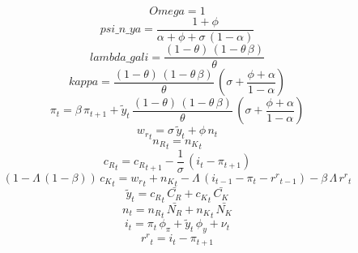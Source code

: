 \begin{dmath*}
Omega = 1
\end{dmath*}
\begin{dmath*}
psi\_n\_ya = \frac{1+{{\phi}}}{{{\alpha}}+{{\phi}}+{{\sigma}}\, \left(1-{{\alpha}}\right)}
\end{dmath*}
\begin{dmath*}
lambda\_gali = \frac{\left(1-{{\theta}}\right)\, \left(1-{{\theta}}\, {{\beta}}\right)}{{{\theta}}}
\end{dmath*}
\begin{dmath*}
kappa = \frac{\left(1-{{\theta}}\right)\, \left(1-{{\theta}}\, {{\beta}}\right)}{{{\theta}}}\, \left({{\sigma}}+\frac{{{\phi}}+{{\alpha}}}{1-{{\alpha}}}\right)
\end{dmath*}
\begin{dmath}
{{\pi}}_{t}={{\beta}}\, {{\pi}}_{t+1}+{{\tilde y}}_{t}\, \frac{\left(1-{{\theta}}\right)\, \left(1-{{\theta}}\, {{\beta}}\right)}{{{\theta}}}\, \left({{\sigma}}+\frac{{{\phi}}+{{\alpha}}}{1-{{\alpha}}}\right)
\end{dmath}
\begin{dmath}
{{w_r}}_{t}={{\sigma}}\, {{\tilde y}}_{t}+{{\phi}}\, {{n}}_{t}
\end{dmath}
\begin{dmath}
{{n_R}}_{t}={{n_K}}_{t}
\end{dmath}
\begin{dmath}
{{c_R}}_{t}={{c_R}}_{t+1}-\frac{1}{{{\sigma}}}\, \left({{i}}_{t}-{{\pi}}_{t+1}\right)
\end{dmath}
\begin{dmath}
\left(1-{{\Lambda}}\, \left(1-{{\beta}}\right)\right)\, {{c_K}}_{t}={{w_r}}_{t}+{{n_K}}_{t}-{{\Lambda}}\, \left({{i}}_{t-1}-{{\pi}}_{t}-{{r^r}}_{t-1}\right)-{{\beta}}\, {{\Lambda}}\, {{r^r}}_{t}
\end{dmath}
\begin{dmath}
{{\tilde y}}_{t}={{c_R}}_{t}\, {\bar{C_R}}+{{c_K}}_{t}\, {\bar{C_K}}
\end{dmath}
\begin{dmath}
{{n}}_{t}={{n_R}}_{t}\, {\bar{N_R}}+{{n_K}}_{t}\, {\bar{N_K}}
\end{dmath}
\begin{dmath}
{{i}}_{t}={{\pi}}_{t}\, {{\phi_{\pi}}}+{{\tilde y}}_{t}\, {{\phi_{y}}}+{{\nu}}_{t}
\end{dmath}
\begin{dmath}
{{r^r}}_{t}={{i}}_{t}-{{\pi}}_{t+1}
\end{dmath}
